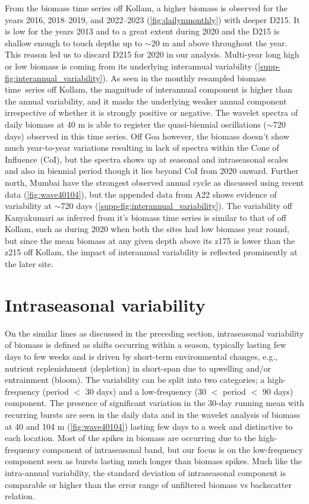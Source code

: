\documentclass{article}
\begin{document}
	From the biomass time series off Kollam, a higher biomass is observed for the years 2016, 2018--2019, and 2022--2023 (\cref{fig:dailynmonthly}) with deeper D215. It is low for the years 2013 and to a great extent during 2020 and the D215 is shallow enough to touch depths up to $\sim$20 m and above throughout the year. This reason led us to discard D215 for 2020 in our analysis. Multi-year long high or low biomass is coming from its underlying interannual variability (\cref{supp-fig:interannual_variability}). As seen in the monthly resampled biomass time~series off Kollam, the magnitude of interannual component is higher than the annual variability, and it masks the underlying weaker annual component irrespective of whether it is strongly positive or negative. The wavelet spectra of daily biomass at 40 m is able to register the quasi-biennial oscillations ($\sim$720 days) observed in this time series. Off Goa however, the biomass doesn't show much year-to-year variations resulting in lack of spectra within the Cone of Influence (CoI), but the spectra shows up at seasonal and intraseasonal scales and also in biennial period though it lies beyond CoI from 2020 onward. Further north, Mumbai have the strongest observed annual cycle as discussed using recent data (\cref{fig:wave40104}), but the appended data from A22 shows evidence of variability at $\sim$720 days (\cref{supp-fig:interannual_variability}). The variability off Kanyakumari as inferred from it's biomass time series is similar to that of off Kollam, such as during 2020 when both the sites had low biomass year round, but since the mean biomass at any given depth above its z175 is lower than the z215 off Kollam, the impact of interannual variability is reflected prominently at the later site.  
	
	\section{Intraseasonal variability}
	\label{sec:intsnvar}
	On the similar lines as discussed in the preceding section, intraseasonal variability of biomass is defined as shifts occurring within a season, typically lasting few days to few weeks and is driven by short-term environmental changes, e.g., nutrient  replenishment (depletion) in short-span due to upwelling and/or entrainment (bloom). The variability can be split into two categories; a high-frequency (period $<$ 30 days) and a low-frequency (30 $<$ period $<$ 90 days) component. The presence of significant variation in the 30-day running mean with recurring bursts are seen in the daily data and in the  wavelet analysis of biomass at 40 and 104 m (\cref{fig:wave40104}) lasting few days to a week and distinctive to each location. Most of the spikes in biomass are occurring due to the high-frequency component of intraseasonal band, but our focus is on the low-frequency component seen as bursts lasting much longer than biomass spikes. Much like the intra-annual variability, the standard deviation of intraseasonal component is comparable or higher than the error range of unfiltered biomass vs backscatter relation.
	
\end{document}
